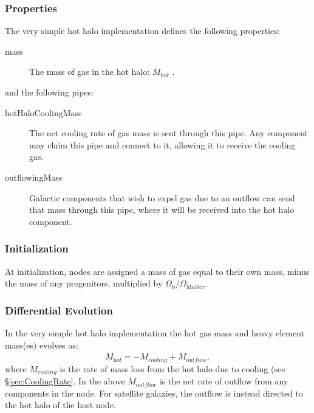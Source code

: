 \subsubsection{Properties}

The very simple hot halo implementation defines the following properties:
\begin{description}
 \item [{\normalfont \ttfamily mass}] The mass of gas in the hot halo: $M_{\mathrm hot}$ {\normalfont \ttfamily [hotHaloMass]}.
\end{description}
and the following pipes:
\begin{description}
 \item [{\normalfont \ttfamily hotHaloCoolingMass}] The net cooling rate of gas mass is sent through this pipe. Any \gls{component} may claim this pipe and connect to it, allowing it to receive the cooling gas.
 \item [{\normalfont \ttfamily outflowingMass}] Galactic components that wish to expel gas due to an outflow can send that mass  through this pipe, where it will be received into the hot halo component. 
\end{description}

\subsubsection{Initialization}

At initialization, nodes are assigned a mass of gas equal to their own mass, minus the mass of any progenitors, multiplied by $\Omega_{\mathrm b}/\Omega_{\mathrm Matter}$.

\subsubsection{Differential Evolution}

In the very simple hot halo implementation the hot gas mass and heavy element mass(es) evolves as:
\begin{equation}
 \dot{M}_{\mathrm hot} = - \dot{M}_{\mathrm cooling} + \dot{M}_{\mathrm outflow},
\end{equation}
where $\dot{M}_{\mathrm cooling}$ is the rate of mass loss from the hot halo due to cooling (see \S\ref{sec:CoolingRate}.
In the above $\dot{M}_{\mathrm outflow}$ is the net rate of outflow from any components in the node. For satellite galaxies, the outflow is instead directed to the hot halo of the host \gls{node}.

